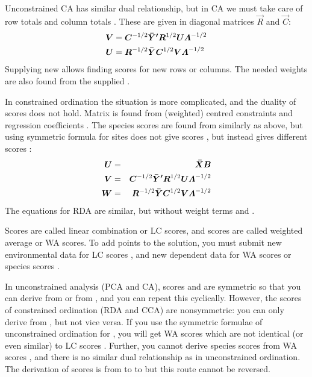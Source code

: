 Unconstrained CA has similar dual relationship, but in CA we must take
care of row totals  and column totals . These are given in
diagonal matrices $\vec{R}$ and $\vec{C}$:
\begin{eqnarray}
\vec{V} &= \vec{C}^{-1/2} \vec{\bar Y'} \vec{R}^{1/2} \vec{U} \bLambda^{-1/2}\\
\vec{U} &= \vec{R}^{-1/2} \vec{\bar Y} \vec{C}^{1/2}\vec{V} \bLambda^{-1/2}
\end{eqnarray}
Supplying new  allows finding scores for new rows or
columns. The needed weights are also found from the supplied .

In constrained ordination the situation is more complicated, and the
duality of scores does not hold. Matrix  is found from
(weighted) centred constraints  and regression
coefficients . The species scores  are found from
 similarly as above, but using symmetric formula for sites does
not give scores , but instead gives different scores :
\begin{eqnarray}
 \vec{U} &=& \vec{\bar X B}\\
 \vec{V} &=& \vec{C}^{-1/2} \vec{\bar Y'} \vec{R}^{1/2} \vec{U} \bLambda^{-1/2}\\
 \vec{W} &=& \vec{R}^{-1/2} \vec{\bar Y} \vec{C}^{1/2} \vec{V} \bLambda^{-1/2}
\end{eqnarray}
The equations for RDA are similar, but without weight terms 
and .

Scores  are called linear combination or LC scores, and scores
 are called weighted average or WA scores. To add points to the
solution, you must submit new environmental data  for LC scores
, and new dependent data  for WA scores  or
species scores .

In unconstrained analysis (PCA and CA), scores  and  are
symmetric so that you can derive  from  or  from
, and you can repeat this cyclically. However, the scores of
constrained ordination (RDA and CCA) are nonsymmetric: you can only
derive  from , but not vice versa. If you use the
symmetric formulae of unconstrained ordination for , you will
get WA scores  which are not identical (or even similar) to LC
scores . Further, you cannot derive species scores  from
WA scores , and there is no similar dual relationship as in
unconstrained ordination. The derivation of scores is from  to
 to  but this route cannot be reversed.



\endinput
